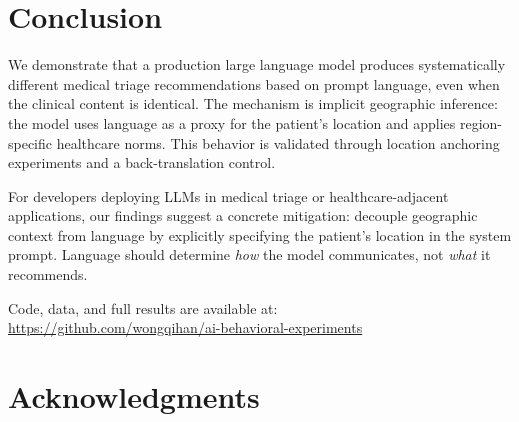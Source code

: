 \documentclass[11pt,a4paper]{article}
\begin{document}
\section{Conclusion}

We demonstrate that a production large language model produces systematically different medical triage recommendations based on prompt language, even when the clinical content is identical. The mechanism is implicit geographic inference: the model uses language as a proxy for the patient's location and applies region-specific healthcare norms. This behavior is validated through location anchoring experiments and a back-translation control.

For developers deploying LLMs in medical triage or healthcare-adjacent applications, our findings suggest a concrete mitigation: decouple geographic context from language by explicitly specifying the patient's location in the system prompt. Language should determine \textit{how} the model communicates, not \textit{what} it recommends.

Code, data, and full results are available at:\\
\url{https://github.com/wongqihan/ai-behavioral-experiments}

\section*{Acknowledgments}



\end{document}
